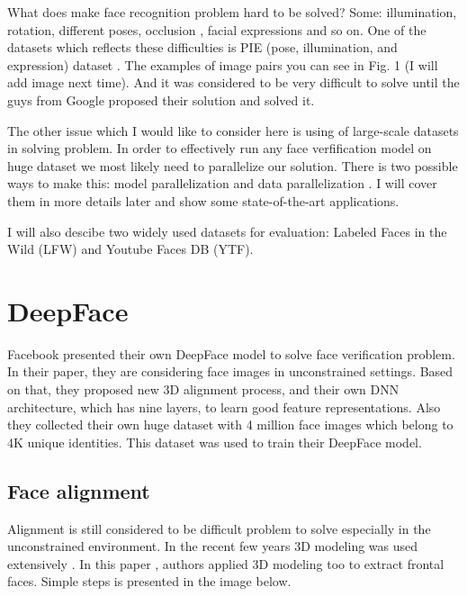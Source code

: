 \documentclass[paper=a4, fontsize=11pt]{scrartcl} %
\numberwithin{equation}{section} %
\numberwithin{figure}{section} %
\numberwithin{table}{section} %
\begin{document}
What does make face recognition problem hard to be solved? Some: illumination, rotation, different poses, occlusion \cite{ekenel2009facial}, facial expressions and so on. One of the datasets which reflects these difficulties is PIE (pose, illumination, and expression) dataset \cite{sim2002cmu}. The examples of image pairs you can see in Fig. 1 (I will add image next time). And it was considered to be very difficult to solve until the guys from Google proposed their solution \cite{schroff2015facenet} and solved it.

The other issue which I would like to consider here is using of large-scale datasets in solving problem. In order to effectively run any face verfification model on huge dataset we most likely need to parallelize our solution. There is two possible ways to make this: model parallelization and data parallelization \cite{dean2012large}. I will cover them in more details later and show some state-of-the-art applications. \par


I will also descibe two widely used datasets for evaluation: Labeled Faces in the Wild (LFW) and Youtube Faces DB (YTF).

\section{DeepFace}

Facebook presented their own DeepFace model \cite{taigman2014deepface} to solve face verification problem. In their paper, they are considering face images in unconstrained settings. Based on that, they proposed new 3D alignment process, and their own DNN architecture, which has nine layers, to learn good feature representations. Also they collected their own huge dataset with 4 million face images which belong to 4K unique identities. This dataset was used to train their DeepFace model.

\subsection{Face alignment}

Alignment is still considered to be difficult problem to solve especially in the unconstrained environment. In the recent few years 3D modeling was used extensively \cite{hassner2013viewing}. In this paper \cite{schroff2015facenet}, authors applied 3D modeling too to extract frontal faces. Simple steps is presented in the image below.\par
\end{document}
